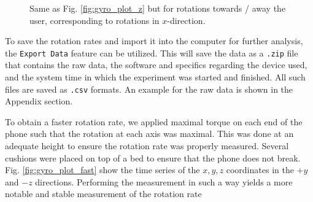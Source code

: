 \documentclass[a4paper]{report}
\numberwithin{equation}{section}
\begin{document}
\begin{figure}[hbt!]
	\centering
	\quad

	\caption{Same as Fig. \ref{fig:gyro_plot_z} but for rotations towards / away the user, corresponding to rotations in $x$-direction.}
	\label{fig:gyro_plot_x}
\end{figure}

To save the rotation rates and import it into the computer for further analysis, the \texttt{Export Data} feature can be utilized. This will save the 
data as a \texttt{.zip} file that contains the raw data, the software and specifics regarding the device used, and the system time in which the experiment was 
started and finished. All such files are saved as \texttt{.csv} formats. An example for the raw data is shown in the Appendix section.\par 

To obtain a faster rotation rate, we applied maximal torque on each end of the phone such that the rotation at each axis was maximal. This was done at an adequate height
to ensure the rotation rate was properly measured. Several cushions were placed on top of a bed to ensure that the phone does not break. Fig. \ref{fig:gyro_plot_fast} show
the time series of the $x, y, z$ coordinates in the $+y$ and $-z$ directions. Performing the measurement in such a way yields a more notable and stable measurement of the rotation rate 
\end{document}
